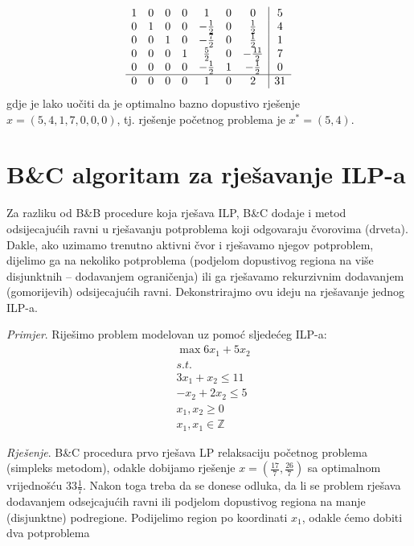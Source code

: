 \documentclass[a4paper, utf8, 11pt, colorlinks]{book}
\begin{document}
$$ \begin{array}{ccccccc| c}
    1    &   0   &   0   &  0 &  1  &   0    &    0    & 5  \\
0    &   1   &   0   &  0   &   -\frac{1}{2}    &   0   & \frac{1}{2} & 4 \\
0    &   0   &   1   &  0   &   -\frac{7}{2}    &   0   & \frac{1}{2} & 1 \\
0    &   0   &   0   &  1  &   \frac{5}{2}    &  0 &  -\frac{11}{2}    & 7 \\ 
0    &   0   &   0   &   0 &  -\frac{1}{2}    &   1   & - \frac{1}{2} & 0\\ \hline
0    &   0   &   0   &  0  &   1    &    0   & 2 & 31  
\end{array} 
$$
gdje je lako uočiti da je optimalno bazno dopustivo rješenje $x=(5, 4, 1, 7, 0, 0, 0 )$, tj. rješenje početnog problema je $x^*=(5, 4)$.

\section{B\&C algoritam za rješavanje ILP-a}
Za razliku od B\&B procedure koja rješava ILP, B\&C dodaje  i metod odsijecajućih ravni u rješavanju  potproblema koji odgovaraju čvorovima (drveta). Dakle, ako  uzimamo trenutno aktivni čvor i rješavamo njegov potproblem, dijelimo ga na nekoliko potproblema (podjelom dopustivog regiona na više disjunktnih -- dodavanjem ograničenja) ili ga rješavamo rekurzivnim dodavanjem (gomorijevih) odsijecajućih ravni. Dekonstrirajmo ovu ideju na rješavanje jednog ILP-a.

\emph{Primjer}.  Riješimo problem modelovan uz pomoć sljedećeg ILP-a:
\begin{align*}
    &\max 6 x_1 + 5 x_2 \\
    &  {s.t. } \\
    & 3x_1 + x_2 \leq 11 \\
    & - x_2 + 2 x_2 \leq 5 \\
    & x_1, x_2 \geq 0 \\
    & x_1, x_1 \in \mathbb{Z}
\end{align*}

\emph{Rješenje}. B\&C procedura prvo rješava LP relaksaciju početnog problema (simpleks metodom), odakle dobijamo rješenje $x=(\frac{17}{7}, \frac{26}{7})$
sa optimalnom vrijednošću $33\frac{1}{7}$. Nakon toga treba da se donese odluka, da li se problem rješava dodavanjem odsejcajućih ravni ili podjelom dopustivog regiona na manje (disjunktne) podregione. Podijelimo region po koordinati $x_1$, odakle ćemo dobiti dva potproblema 
\end{document}
